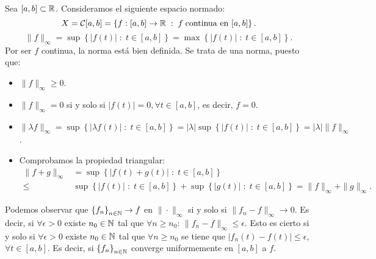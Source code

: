 \begin{eg}
	Sea $\displaystyle \left[a,b\right] \subset \mathbb{R} $. Consideramos el siguiente espacio normado:
	\[X = \mathcal{C}[a,b] = \left\{ f : [a,b] \to \mathbb{R} \; : \; f \; \text{continua en } [a,b]\right\}  .\]
	\[\| f \|_{\infty} = \sup \left\{ \left|f\left(t\right)\right| \; : \; t \in [a,b]\right\} = \max \left\{ \left|f\left(t\right)\right| \; : \; t \in [a,b]\right\}  .\]
	Por ser $\displaystyle f $ continua, la norma está bien definida. Se trata de una norma, puesto que:
	\begin{itemize}
	\item $\displaystyle \|f\|_{\infty} \geq 0 $.
	\item $\displaystyle \| f \|_{\infty} = 0 $ si y solo si $\displaystyle \left|f\left(t\right)\right| = 0, \forall t \in [a,b] $, es decir, $\displaystyle f = 0 $.
	\item $\displaystyle \|\lambda f\|_{\infty} = \sup \left\{ \left|\lambda f\left(t\right)\right| \; : \; t \in [a,b]\right\} = \left|\lambda \right|\sup \left\{ \left|f\left(t\right)\right| \; : \; t \in [a,b]\right\} = \left|\lambda \right| \|f\|_{\infty} $.
	\item Comprobamos la propiedad triangular:
		\[
		\begin{split}
			\| f + g \|_{\infty} & = \sup \left\{ \left|f\left(t\right) + g\left(t\right) \right| \; : \; t \in [a,b]\right\} \\
			\leq & \sup \left\{ \left|f\left(t\right)\right| \; : \; t \in [a,b]\right\} + \sup \left\{ \left|g\left(t\right)\right| \; : \; t \in [a,b]\right\}  = \|f\|_{\infty} + \|g\|_{\infty} .
		\end{split}
		\]
	\end{itemize}
	Podemos observar que $\displaystyle \left\{ f_{n}\right\} _{n\in\mathbb{N}} \to f $ en $\displaystyle \| \cdot \|_{\infty} $ si y solo si $\displaystyle \| f_{n} - f\|_{\infty} \to 0 $. Es decir, si $\displaystyle \forall \epsilon > 0 $ existe $\displaystyle n_{0} \in \mathbb{N} $ tal que $\displaystyle \forall n \geq n_{0} $: $\displaystyle \| f_{n}-f\|_{\infty} \leq \epsilon  $. Esto es cierto si y solo si $\displaystyle \forall \epsilon > 0 $ existe $\displaystyle n_{0} \in \mathbb{N} $ tal que $\displaystyle \forall n \geq n_{0} $ se tiene que $\displaystyle \left|f_{n}\left(t\right)-f\left(t\right)\right| \leq \epsilon  $, $\displaystyle \forall t \in [a,b] $.
	Es decir, si $\displaystyle \left\{ f_{n}\right\} _{n\in\mathbb{N}} $ converge uniformemente en $\displaystyle [a,b] $ a $\displaystyle f $. \\ \\

\end{eg}
